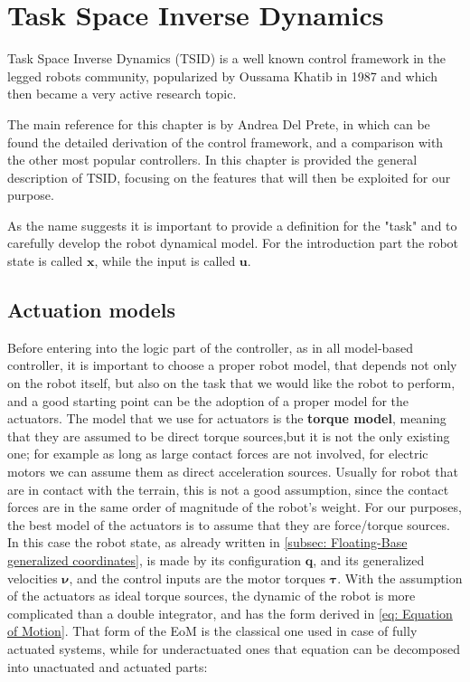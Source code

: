\chapter{Task Space Inverse Dynamics}
\label{ch:chapter_three}%


Task Space Inverse Dynamics (TSID) is a well known control framework in the legged robots community, popularized by Oussama Khatib \cite{Khatib1987} in 1987 and which then became a very active research topic.

The main reference for this chapter is \cite{Del-Prete2013} by Andrea Del Prete, in which can be found the detailed derivation of the control framework, and a comparison with the other most popular controllers.
In this chapter is provided the general description of TSID, focusing on the features that will then be exploited for our purpose.

As the name suggests it is important to provide a definition for the "task" and to carefully develop the robot dynamical model.
For the introduction part the robot state is called $\mathbf{x}$, while the input is called $\mathbf{u}$. 

\section{Actuation models}
\label{sec:Actuation models}

Before entering into the logic part of the controller, as in all model-based controller, it is important to choose a proper robot model, that depends not only on the robot itself, but also on the task that we would like the robot to perform, and a good starting point can be the adoption of a proper model for the actuators.
The model that we use for actuators is the \textbf{torque model}, meaning that they are assumed to be direct torque sources,but it is not the only existing one; for example as long as large contact forces are not involved, for electric motors we can assume them as direct acceleration sources.
Usually for robot that are in contact with the terrain, this is not a good assumption, since the contact forces are in the same order of magnitude of the robot's weight.
For our purposes, the best model of the actuators is to assume that they are force/torque sources.
In this case the robot state, as already written in \cref{subsec: Floating-Base generalized coordinates}, is made by its configuration $\mathbf{q}$, and its generalized velocities $\bm{\nu}$, and the control inputs are the motor torques $\bm{\tau}$.
With the assumption of the actuators as ideal torque sources, the dynamic of the robot is more complicated than a double integrator, and has the form derived in \eqref{eq: Equation of Motion}.
That form of the EoM is the classical one used in case of fully actuated systems, while for underactuated ones that equation can be decomposed into unactuated and actuated parts:


